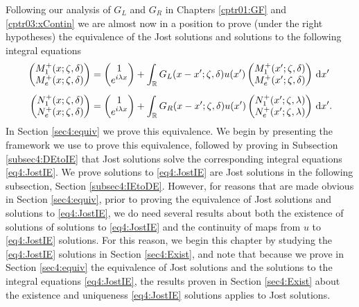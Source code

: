 \documentclass[../dissertation.tex]{subfiles}
\begin{document}
Following our analysis of $G_L$ and $G_R$ in Chapters \ref{cptr01:GF} and
\ref{cptr03:xContin} we are almost now in a position to prove (under the right hypotheses) 
the equivalence of the Jost solutions and solutions to the following integral
equations
\begin{subequations}
	\label{eq4:JostIE}
	\begin{align}
		\label{eq4:JostIEleft}
		\begin{pmatrix}
			M_1^+(x; \zeta, \delta) \\
			M_e^+(x; \zeta, \delta)
		\end{pmatrix}
			&= 
				\begin{pmatrix}
					1 \\
					e^{i\lambda x} 
				\end{pmatrix}
				+ \int_{\mathbb R} G_L(x - x'; \zeta, \delta) 
					u(x')
					\begin{pmatrix}
						M_1^+(x'; \zeta, \delta) \\
						M_e^+(x'; \zeta, \delta) 
					\end{pmatrix}
					\, \mathrm{d}x' \\[0.3\baselineskip]
		\label{eq4:JostIEright}
		\begin{pmatrix}
			N_1^+(x; \zeta, \delta) \\
			N_e^+(x; \zeta, \delta)
		\end{pmatrix}
			&= 
				\begin{pmatrix}
					1 \\
					e^{i\lambda x} 
				\end{pmatrix}
				+ \int_{\mathbb R} G_R(x - x'; \zeta, \delta) 
					u(x')
					\begin{pmatrix}
						N_1^+(x'; \zeta, \lambda) \\
						N_e^+(x'; \zeta, \lambda) 
					\end{pmatrix}
					\, \mathrm{d}x'.
	\end{align}
\end{subequations}
In Section \ref{sec4:equiv} we prove this equivalence.
We begin by presenting the framework we use to prove this equivalence, 
followed by proving in Subsection \ref{subsec4:DEtoIE} that Jost solutions solve the 
corresponding integral equations \eqref{eq4:JostIE}. We prove solutions to 
\eqref{eq4:JostIE} are Jost solutions in the following subsection, Section 
\ref{subsec4:IEtoDE}.
However, for reasons that are made obvious in 
Section \ref{sec4:equiv}, prior to proving 
the equivalence of Jost solutions and solutions to \eqref{eq4:JostIE}, we do need 
several results about both the existence of solutions of solutions to \eqref{eq4:JostIE}
and the continuity of maps from $u$ to \eqref{eq4:JostIE} solutions. For this reason, 
we begin this chapter by studying the \eqref{eq4:JostIE} solutions in Section 
\ref{sec4:Exist}, and note that because we prove in Section \ref{sec4:equiv} the
equivalence of Jost solutions and the solutions to the integral equations \eqref{eq4:JostIE},
the results proven in Section \ref{sec4:Exist} about the existence and uniqueness 
\eqref{eq4:JostIE} solutions applies to Jost solutions.
\end{document}
